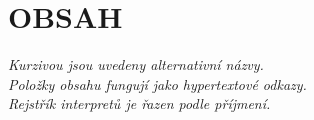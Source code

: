 \hypersetup{
linkcolor=black
}
\hypertarget{obsah}{}
\section*{\Huge OBSAH}
\large
\noindent\textit{Kurzivou jsou uvedeny alternativní názvy.\\
Položky obsahu fungují jako hypertextové odkazy.\\
Rejstřík interpretů je řazen podle příjmení.}
\vspace{-5pt}


\begin{center}\zprule{18cm}\end{center}

\vspace{5pt}

